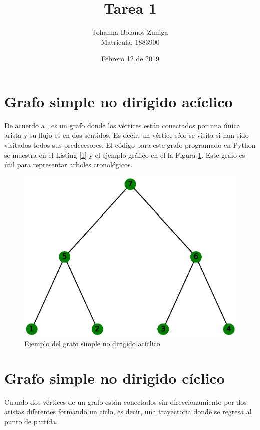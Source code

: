 \documentclass{article}
\title{Tarea 1}
\author{Johanna Bolanos Zuniga \\ 
	Matricula: 1883900}
\date{Febrero 12 de 2019} %
\begin{document}
\maketitle %

\section{Grafo simple no dirigido acíclico}
De acuerdo a \cite{Ahuja2017}, es un grafo donde los vértices están conectados por una única arista y su flujo es en dos sentidos. Es decir, un vértice sólo se visita si han sido visitados todos sus predecesores. El código para este grafo programado en Python se muestra en el Listing \ref{1} y el ejemplo gráfico en el la Figura \ref{fig:g1}. Este grafo es útil para representar arboles cronológicos.

\label{1}
 


\begin{figure}[htp]
\centering
\includegraphics[scale=0.4]{g1.eps}
\caption{Ejemplo del grafo simple no dirigido acíclico}
\label{fig:g1}
\end{figure}


\section{Grafo simple no dirigido cíclico}
Cuando dos vértices de un grafo están conectados sin direccionamiento por dos aristas diferentes formando un ciclo, es decir, una trayectoria donde se regresa al punto de partida.
\end{document}
